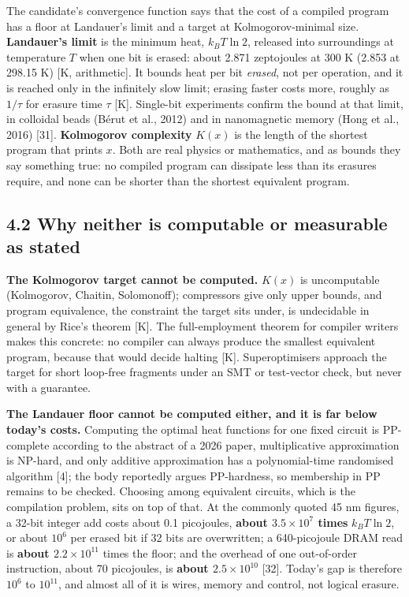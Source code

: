 \documentclass[10pt,letterpaper]{article}
\newcounter{none}
\begin{document}
The candidate's convergence function says that the cost of a compiled
program has a floor at Landauer's limit and a target at
Kolmogorov-minimal size. \textbf{Landauer's limit} is the minimum heat,
\(k_B T \ln 2\), released into surroundings at temperature \(T\) when
one bit is erased: about 2.871 zeptojoules at 300 K (2.853 at 298.15 K)
{[}K, arithmetic{]}. It bounds heat per bit \emph{erased}, not per
operation, and it is reached only in the infinitely slow limit; erasing
faster costs more, roughly as \(1/\tau\) for erasure time \(\tau\)
{[}K{]}. Single-bit experiments confirm the bound at that limit, in
colloidal beads (Bérut et al., 2012) and in nanomagnetic memory (Hong et
al., 2016) {[}31{]}. \textbf{Kolmogorov complexity} \(K(x)\) is the
length of the shortest program that prints \(x\). Both are real physics
or mathematics, and as bounds they say something true: no compiled
program can dissipate less than its erasures require, and none can be
shorter than the shortest equivalent program.

\subsection{4.2 Why neither is computable or measurable as
stated}\label{why-neither-is-computable-or-measurable-as-stated}

\textbf{The Kolmogorov target cannot be computed.} \(K(x)\) is
uncomputable (Kolmogorov, Chaitin, Solomonoff); compressors give only
upper bounds, and program equivalence, the constraint the target sits
under, is undecidable in general by Rice's theorem {[}K{]}. The
full-employment theorem for compiler writers makes this concrete: no
compiler can always produce the smallest equivalent program, because
that would decide halting {[}K{]}. Superoptimisers approach the target
for short loop-free fragments under an SMT or test-vector check, but
never with a guarantee.

\textbf{The Landauer floor cannot be computed either, and it is far
below today's costs.} Computing the optimal heat functions for one fixed
circuit is PP-complete according to the abstract of a 2026 paper,
multiplicative approximation is NP-hard, and only additive approximation
has a polynomial-time randomised algorithm {[}4{]}; the body reportedly
argues PP-hardness, so membership in PP remains to be checked. Choosing
among equivalent circuits, which is the compilation problem, sits on top
of that. At the commonly quoted 45 nm figures, a 32-bit integer add
costs about 0.1 picojoules, \textbf{about \(3.5\times10^{7}\) times}
\(k_B T \ln 2\), or about \(10^6\) per erased bit if 32 bits are
overwritten; a 640-picojoule DRAM read is \textbf{about
\(2.2\times10^{11}\)} times the floor; and the overhead of one
out-of-order instruction, about 70 picojoules, is \textbf{about
\(2.5\times10^{10}\)} {[}32{]}. Today's gap is therefore \(10^6\) to
\(10^{11}\), and almost all of it is wires, memory and control, not
logical erasure.
\end{document}
